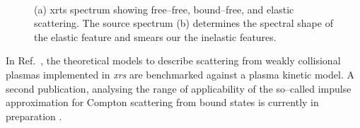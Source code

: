 \documentclass[12pt]{scrartcl}
\begin{document}
\begin{figure}[ht]
  \begin{center}
    \\
  \end{center}
  \caption{(a) \gls{xrts} spectrum showing free--free, bound--free, and elastic
  scattering. The source spectrum (b) determines the spectral shape of the elastic
feature and smears our the inelastic features.}
  \label{fig:xrts_spectrum_and_source}
\end{figure}

In Ref.~\cite{Rozmus2017_submitted}, the theoretical models to describe
scattering from weakly collisional plasmas implemented in \textit{xrs} are
benchmarked against a plasma kinetic model. A second publication, analysing the
range of applicability of the so--called impulse approximation for Compton
scattering from bound states is currently in preparation \cite{Bell2017_prep}.
%
\end{document}
